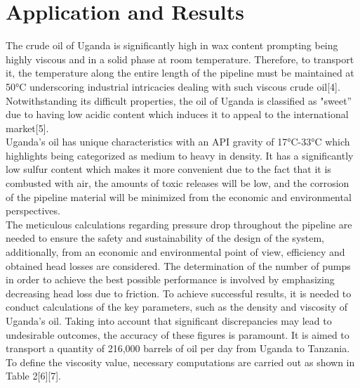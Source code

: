 \documentclass[12pt]{article}
\begin{document}
\section{Application and Results}
{\fontsize{12}{12}\selectfont 
The crude oil of Uganda is significantly high in wax content prompting being highly viscous and in a solid phase at room temperature. Therefore, to transport it, the temperature along the entire length of the pipeline must be maintained at 50°C underscoring industrial intricacies dealing with such viscous crude oil[4]. Notwithstanding its difficult properties, the oil of Uganda is classified as "sweet” due to having low acidic content which induces it to appeal to the international market[5]. 
\\

Uganda's oil has unique characteristics with an API gravity of 17°C-33°C which highlights being categorized as medium to heavy in density. It has a significantly low sulfur content which makes it more convenient due to the fact that it is combusted with air, the amounts of toxic releases will be low, and the corrosion of the pipeline material will be minimized from the economic and environmental perspectives.
\\

The meticulous calculations regarding pressure drop throughout the pipeline are needed to ensure the safety and sustainability of the design of the system, additionally, from an economic and environmental point of view, efficiency and obtained head losses are considered. The determination of the number of pumps in order to achieve the best possible performance is involved by emphasizing decreasing head loss due to friction. To achieve successful results, it is needed to conduct calculations of the key parameters, such as the density and viscosity of Uganda's oil. Taking into account that significant discrepancies may lead to undesirable outcomes, the accuracy of these figures is paramount. It is aimed to transport a quantity of 216,000 barrels of oil per day from Uganda to Tanzania.
\\

To define the viscosity value, necessary computations are carried out as shown in Table 2[6][7].

}
\end{document}
